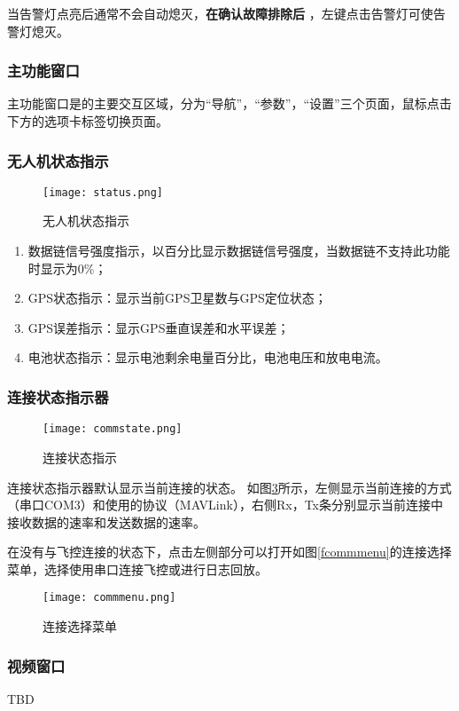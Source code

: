 当告警灯点亮后通常不会自动熄灭，{\color{red}\textbf{在确认故障排除后} }，左键点击告警灯可使告警灯熄灭。


\subsubsection{主功能窗口}
主功能窗口是\csciname 的主要交互区域，分为“导航”，“参数”，“设置”三个页面，鼠标点击下方的选项卡标签切换页面。

\subsubsection{无人机状态指示}
\begin{figure}[ht]
	\begin{center}
		\texttt{[image: status.png]}
		\caption{无人机状态指示}
		\label{fstatus}
	\end{center}
\end{figure}
\begin{enumerate}[label=\arabic*.,topsep=0pt]
\setlength{\itemsep}{-2pt}
\item 数据链信号强度指示，以百分比显示数据链信号强度，当数据链不支持此功能时显示为0\%；
\item GPS状态指示：显示当前GPS卫星数与GPS定位状态；
\item GPS误差指示：显示GPS垂直误差和水平误差；
\item 电池状态指示：显示电池剩余电量百分比，电池电压和放电电流。
\end{enumerate}

\subsubsection{连接状态指示器}
\begin{figure}[ht]
	\begin{center}
		\texttt{[image: commstate.png]}
		\caption{连接状态指示}
		\label{fcomm}
	\end{center}
\end{figure}

连接状态指示器默认显示当前连接的状态。
如图\ref{fcomm}所示，左侧显示当前连接的方式（串口COM3）和使用的协议（MAVLink），右侧Rx，Tx条分别显示当前连接中接收数据的速率和发送数据的速率。

在没有与飞控连接的状态下，点击左侧部分可以打开如图\ref{fcommmenu}的连接选择菜单，选择使用串口连接飞控或进行日志回放。
\begin{figure}[ht]
	\begin{center}
		\texttt{[image: commmenu.png]}
		\caption{连接选择菜单}
		\label{fcomm}
	\end{center}
\end{figure}
\subsubsection{视频窗口}
TBD
\clearpage
\endinput
















